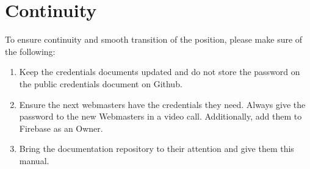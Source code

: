 \documentclass[a4paper]{article}
\begin{document}
\newpage

\section{Continuity}
To ensure continuity and smooth transition of the position, please make sure of the following:
\begin{enumerate}
  \item Keep the credentials documents updated and do not store the password on the public credentials document on Github.
  \item Ensure the next webmasters have the credentials they need. Always give the password to the new Webmasters in a video call. Additionally, add them to Firebase as an Owner.
  \item Bring the documentation repository to their attention and give them this manual.
\end{enumerate}

\end{document}
